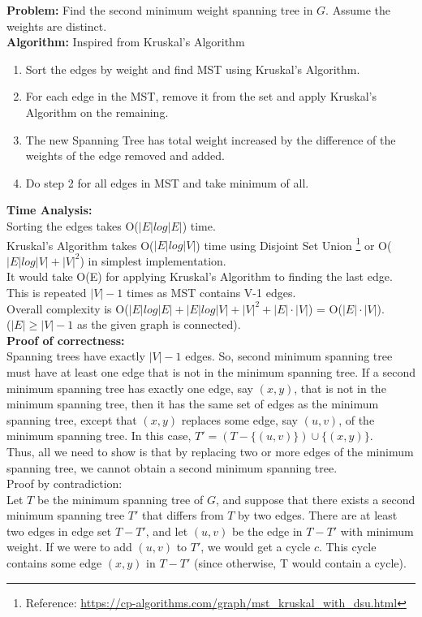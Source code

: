 \documentclass[11pt, fleqn]{article}
\begin{document}
\textbf{Problem:} Find the second minimum weight spanning tree in $G$. Assume the weights are distinct. \\
\textbf{Algorithm:}
Inspired from Kruskal's Algorithm
\begin{enumerate}
    \item Sort the edges by weight and find MST using Kruskal's Algorithm.
    \item For each edge in the MST, remove it from the set and apply Kruskal's Algorithm on the remaining.
    \item The new Spanning Tree has total weight increased by the difference of the weights of the edge removed and added.
    \item Do step 2 for all edges in MST and take minimum of all.
\end{enumerate}
\textbf{Time Analysis:} \\
Sorting the edges takes O($|E|log|E|$) time. \\
Kruskal's Algorithm takes O($|E|log|V|$) time using Disjoint Set Union \footnote{Reference: \url{ https://cp-algorithms.com/graph/mst_kruskal_with_dsu.html}} or O($|E|log|V| + |V|^2$) in simplest implementation. \\
It would take O(E) for applying Kruskal's Algorithm to finding the last edge. \\
This is repeated $|V| - 1$ times as MST contains V-1 edges. \\
Overall complexity is O($|E|log|E| + |E|log|V| +|V|^2 + |E|\cdot|V|$) = O($|E|\cdot|V|$). \\
($|E| \ge |V| - 1$ as the given graph is connected). \\
\textbf{Proof of correctness:} \\
Spanning trees have exactly $|V| - 1$ edges. So, second minimum spanning tree must have at least one edge that is not in the minimum spanning tree. If a second minimum spanning tree has exactly one edge, say $(x, y)$, that is not in the minimum spanning tree, then it has the same set of edges as the minimum spanning tree, except that $(x, y)$ replaces some edge, say $(u, v)$, of the minimum spanning tree. In this case, $T' = (T - \{(u, v)\}) \cup \{(x,y)\}$. \\
Thus, all we need to show is that by replacing two or more edges of the minimum spanning tree, we cannot obtain a second minimum spanning tree. \\
Proof by contradiction: \\
Let $T$ be the minimum spanning tree of $G$, and suppose that there exists a second minimum spanning tree $T'$ that differs from $T$ by two edges. There are at least two edges in edge set $T - T'$, and let $(u, v)$ be the edge in $T - T'$ with minimum weight. If we were to add $(u, v)$ to $T'$, we would get a cycle $c$. This cycle contains some edge $(x, y)$ in $T - T'$ (since otherwise, T would contain a cycle). \\
\end{document}

